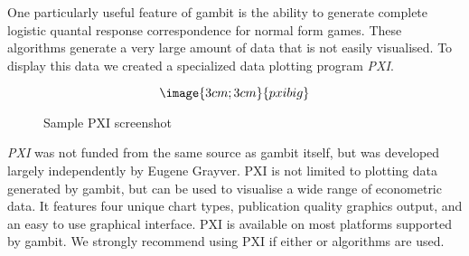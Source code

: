 One particularly useful feature of gambit is the ability to generate complete 
logistic quantal response correspondence for normal form games.  These
algorithms generate a very large amount of data that is not easily visualised.
To display this data we created a specialized data plotting program {\em PXI}.


\begin{figure}
$$\image{3cm;3cm}{pxibig}$$
\caption{Sample PXI screenshot}\label{fig_pxibig}
\end{figure}

{\em PXI} was not funded from the same source as gambit itself, but was 
developed largely independently by Eugene Grayver.  PXI is not limited to
plotting data generated by gambit, but can be used to visualise a wide range
of econometric data.  It features four unique chart types, publication quality
graphics output, and an easy to use graphical interface.  PXI is available on
most platforms supported by gambit.  We strongly recommend using PXI if
either  or  algorithms are used.





%
\setfooter{\thepage}{}{}{}{}{\thepage}%

